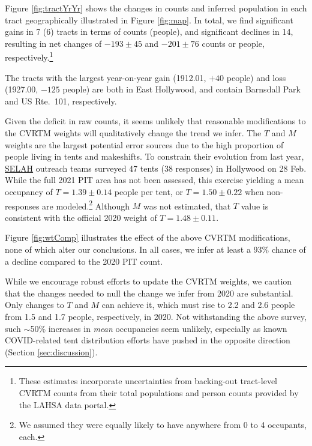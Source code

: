 \documentclass[11pt,twocolumn]{article}
\def\resp{respectively}
\begin{document}
Figure \ref{fig:tractYrYr} shows the changes in counts and inferred population in each tract 
geographically illustrated in Figure \ref{fig:map}. In total, we find significant gains in 7 (6)
tracts in terms of counts (people), and significant declines in 14, resulting in net changes of $-193\pm45$
and $-201\pm76$ counts or people, \resp.\footnote{These estimates incorporate uncertainties 
from backing-out tract-level CVRTM counts from their total populations and person counts provided
by the LAHSA data portal.}

The tracts with the largest year-on-year gain (1912.01, $+40$ people) and loss (1927.00, $-125$ people)
are both in East Hollywood, and contain Barnsdall Park and US Rte.~101, \resp. 


Given the deficit in raw counts, it seems unlikely that reasonable modifications to the CVRTM weights 
will qualitatively change the trend we infer. The $T$ and $M$ weights are the largest potential error 
sources due to the high proportion of people living in tents and makeshifts. To constrain their evolution
from last year, \href{https://selahnhc.org}{SELAH} outreach teams surveyed 47 tents (38 responses) 
in Hollywood on 28 Feb. While the full 2021 PIT area has not been assessed, this exercise
yielding a mean occupancy of $T=1.39\pm0.14$ people per tent, or $T=1.50\pm0.22$ when 
non-responses are modeled.\footnote{We assumed they were equally likely to have anywhere 
from 0 to 4 occupants, each.} Although $M$ was not estimated, that $T$ value is consistent with 
the official 2020 weight of $T=1.48\pm0.11$. 

Figure \ref{fig:wtComp} illustrates the effect of the above CVRTM modifications, none of which 
alter our conclusions. In all cases, we infer at least a 93\% chance of a decline compared to the 2020 
PIT count.

While we encourage robust efforts to update the CVRTM weights, we caution that the changes needed 
to null the change we infer from 2020 are substantial. Only changes to $T$ and $M$ can achieve it, 
which must rise to 2.2 and 2.6 people from 1.5 and 1.7 people, \resp, in 2020. Not withstanding
the above survey, such $\sim$50\% increases in {\it mean} occupancies seem unlikely, especially as
known COVID-related tent distribution efforts have pushed in the opposite direction (Section 
\ref{sec:discussion}).
\end{document}
